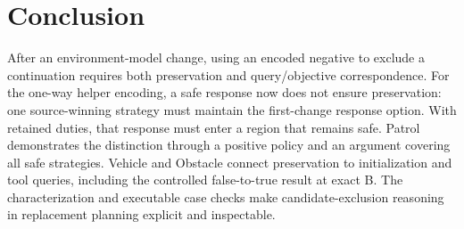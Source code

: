 \section{Conclusion}\label{sec:conclusion}
After an environment-model change, using an encoded negative to exclude a
continuation requires both preservation and query/objective correspondence.
For the one-way helper encoding, a safe response now does not ensure
preservation: one source-winning strategy must maintain the first-change
response option. With retained duties, that response must enter a region
that remains safe. Patrol demonstrates the distinction through a positive
policy and an argument covering all safe strategies. Vehicle and Obstacle
connect preservation to initialization and tool queries, including the
controlled false-to-true result at exact B. The characterization and executable
case checks make candidate-exclusion reasoning in replacement planning
explicit and inspectable.
